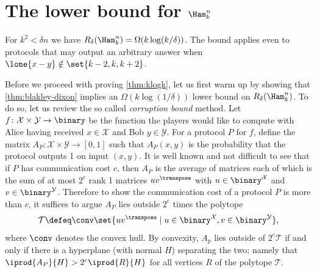 \section{The lower bound for $\Ham^n_k$}
\label{sec:ham:lowerbound}

\begingroup
\def\thetheorem{\ref{thm:klogk}}
\begin{theorem}[restated]
For $k^2<\delta n$ we have 
$R_{\delta}(\Ham^n_k) = \Omega(k\log (k/\delta))$.
The bound applies even to protocols that may
output an arbitrary answer when $\lone{x-y} \notin \set{k-2, k,k+2}$.
\end{theorem}
\addtocounter{theorem}{-1}
\endgroup
Before we proceed with proving \autoref{thm:klogk}, let us
first warm up by showing that \autoref{thm:blakley-dixon} 
implies an  $\Omega(k\log(1/\delta))$ lower bound on 
$R_\delta(\Ham^n_k)$.
To do so, let us review the so called {\em corruption bound}
method. Let  $f\colon\mathcal{X}\times\mathcal{Y}\to\binary$ 
be the function the players would like to compute with 
Alice having received $x\in \mathcal{X}$ and Bob $y\in \mathcal{Y}$. 
For a protocol $P$ for $f$, define the matrix 
$A_P\colon\mathcal{X}\times\mathcal{Y}\to[0,1]$ 
such that $A_P(x,y)$ is the probability
that the protocol outputs 1 on input $(x,y)$.
It is well known and not difficult to see that
if $P$ has communication cost $c$, then $A_P$ is the
average of matrices each of which is the sum of at most
$2^c$ rank 1 matrices $u v^\transpose$ with 
$u\in \binary^\mathcal{X}$ and $v\in\binary^\mathcal{Y}$.
Therefore to show the communication cost of a protocol
$P$ is more than $c$, it suffices to argue $A_P$ lies
outside $2^c$ times the polytope
\begin{align*}
\mathcal{T}\defeq 
\conv\set{uv^\transpose\mid 
u\in\binary^\mathcal{X}, v\in\binary^\mathcal{Y}},
\end{align*}
where $\conv$ denotes the convex hull. By convexity, 
$A_p$ lies outside of $2^c\mathcal{T}$ if and only if there 
is a hyperplane (with normal $H$) separating the two; 
namely that $\iprod{A_P}{H}>2^c\iprod{R}{H}$ for all 
vertices $R$ of the polytope $\mathcal{T}$.

